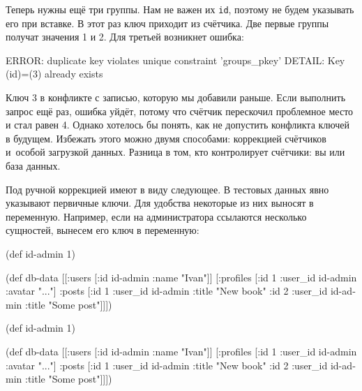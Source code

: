 Теперь нужны ещё три группы. Нам не важен их \verb|id|, поэтому не будем
указывать его при вставке. В этот раз ключ приходит из счётчика. Две первые
группы получат значения 1 и 2. Для третьей возникнет ошибка:


\begin{english}
  \begin{text}
ERROR: duplicate key violates
       unique constraint 'groups_pkey'
DETAIL: Key (id)=(3) already exists
  \end{text}
\end{english}

Ключ 3 в конфликте с записью, которую мы добавили раньше. Если выполнить запрос
ещё раз, ошибка уйдёт, потому что счётчик перескочил проблемное место и стал
равен 4. Однако хотелось бы понять, как не допустить конфликта ключей в будущем.
Избежать этого можно двумя способами: коррекцией счётчиков и~особой загрузкой
данных. Разница в том, кто контролирует счётчики: вы или база данных.

Под ручной коррекцией имеют в виду следующее. В тестовых данных явно указывают
первичные ключи. Для удобства некоторые из них выносят в переменную. Например,
если на администратора ссылаются несколько сущностей, вынесем его ключ в
переменную:

\ifnarrow

\begin{english}
  \begin{clojure}
(def id-admin 1)

(def db-data
  [[:users [{:id id-admin
             :name "Ivan"}]]
   [:profiles [{:id 1
                :user_id id-admin
                :avatar "..."}]
    :posts [{:id 1
             :user_id id-admin
             :title "New book"}
            {:id 2
             :user_id id-admin
             :title "Some post"}]]])
  \end{clojure}
\end{english}

\else

\begin{english}
  \begin{clojure}
(def id-admin 1)

(def db-data
  [[:users [{:id id-admin :name "Ivan"}]]
   [:profiles [{:id 1 :user_id id-admin :avatar "..."}]
    :posts [{:id 1 :user_id id-admin
             :title "New book"}
            {:id 2 :user_id id-admin
             :title "Some post"}]]])
  \end{clojure}
\end{english}

